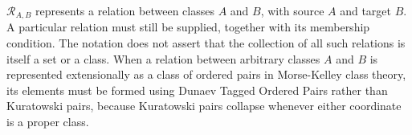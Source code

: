 \def\topic{Notation for class relations}


\newcommand{\classrelation}[2]{\mathcal{R}_{#1,#2}}

\(\classrelation{A}{B}\) represents a relation between classes \(A\) and \(B\),
with source \(A\) and target \(B\). A particular relation must still be supplied,
together with its membership condition. The notation does not assert that
the collection of all such relations is itself a set or a class.
When a relation between arbitrary classes \(A\) and \(B\) is represented
extensionally as a class of ordered pairs in Morse-Kelley class theory, its
elements must be formed using Dunaev Tagged Ordered Pairs rather than
Kuratowski pairs, because Kuratowski pairs collapse whenever either coordinate
is a proper class.

